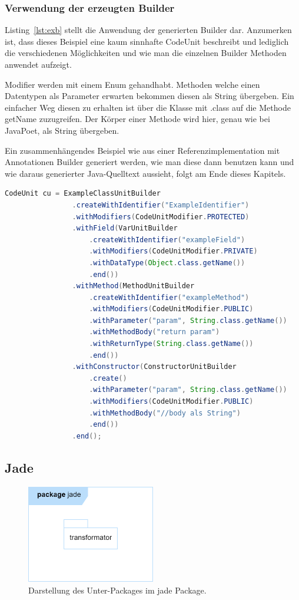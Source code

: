 \documentclass[12pt,oneside,a4paper,parskip]{scrbook}
\begin{document}
\subsubsection{Verwendung der erzeugten Builder}

Listing~\ref{lst:exb} stellt die Anwendung der generierten Builder dar. Anzumerken ist, dass dieses Beispiel eine kaum sinnhafte CodeUnit beschreibt und lediglich die verschiedenen Möglichkeiten und wie man die einzelnen Builder Methoden anwendet aufzeigt.

Modifier werden mit einem Enum gehandhabt. Methoden welche einen Datentypen als Parameter erwarten bekommen diesen als String übergeben. Ein einfacher Weg diesen zu erhalten ist über die Klasse mit .class auf die Methode getName zuzugreifen. Der Körper einer Methode wird hier, genau wie bei JavaPoet, als String übergeben.

Ein zusammenhängendes Beispiel wie aus einer Referenzimplementation mit Annotationen Builder generiert werden, wie man diese dann benutzen kann und wie daraus generierter Java-Quelltext aussieht, folgt am Ende dieses Kapitels.

\begin{lstlisting}[label=lst:exb,
language=java,
firstnumber=1,
caption=Quelltext zur Verwendung verschiedener erzeugter Builder.]
CodeUnit cu = ExampleClassUnitBuilder
				.createWithIdentifier("ExampleIdentifier")
				.withModifiers(CodeUnitModifier.PROTECTED)
				.withField(VarUnitBuilder
					.createWithIdentifier("exampleField")
					.withModifiers(CodeUnitModifier.PRIVATE)
					.withDataType(Object.class.getName())
					.end())
				.withMethod(MethodUnitBuilder
					.createWithIdentifier("exampleMethod")
					.withModifiers(CodeUnitModifier.PUBLIC)
					.withParameter("param", String.class.getName())
					.withMethodBody("return param")
					.withReturnType(String.class.getName())
					.end())
				.withConstructor(ConstructorUnitBuilder
					.create()
					.withParameter("param", String.class.getName())
					.withModifiers(CodeUnitModifier.PUBLIC)
					.withMethodBody("//body als String")
					.end())
				.end();
\end{lstlisting}

\subsection{Jade}

\begin{figure}[htbp]
	\centering
	\includegraphics[width=0.5\textwidth]{bilder/jade}
	\caption{Darstellung des Unter-Packages im jade Package.}
	\label{fig:jadePackages}
\end{figure}
\end{document}
